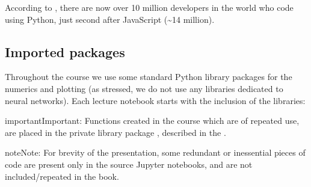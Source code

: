 \documentclass[letterpaper,10pt,english]{jupyterBook}
\begin{document}
\sphinxAtStartPar
According to , there are now over 10 million developers in the world who code using Python, just second after JavaScript (\textasciitilde{}14 million).


\subsection{Imported packages}
\label{\detokenize{docs/intro:imported-packages}}
\sphinxAtStartPar
Throughout the course we use some standard Python library packages for the numerics and plotting (as stressed, we do not use any libraries dedicated to neural networks). Each lecture notebook starts with the inclusion of the libraries:

\begin{sphinxVerbatim}[commandchars=\\\{\}]
   

   

     
\end{sphinxVerbatim}

\begin{sphinxadmonition}{important}{Important:}
\sphinxAtStartPar
Functions created in the course which are of repeated use, are placed in the private library package , described in the {\hyperref[\detokenize{docs/appendix:app-lab}]{}}.
\end{sphinxadmonition}

\begin{sphinxadmonition}{note}{Note:}
\sphinxAtStartPar
For brevity of the presentation, some redundant or inessential pieces of code are present only in the source Jupyter notebooks, and are not included/repeated in the book.
\end{sphinxadmonition}
\end{document}

